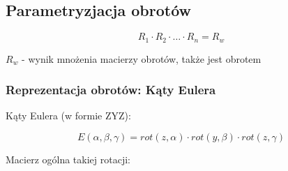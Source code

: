 \documentclass{article}
\begin{document}
\newpage

\subsection{Parametryzjacja obrotów}

\Large
$$
    R_{1}\cdot R_{2} \cdot \ldots \cdot R_{n} = R_{w}
$$
\normalsize

$R_{w}$ - wynik mnożenia macierzy obrotów, także jest obrotem

\subsubsection{Reprezentacja obrotów: Kąty Eulera}

Kąty Eulera (w formie ZYZ):

\Large
$$
    E\left(\alpha, \beta, \gamma\right)=rot\left(z, \alpha\right) \cdot rot\left(y, \beta\right) \cdot rot\left(z, \gamma\right)
$$
\normalsize

Macierz ogólna takiej rotacji:
\end{document}
